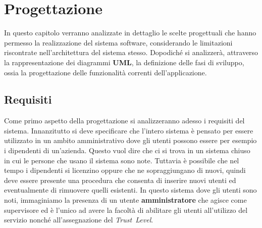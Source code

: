 \def \ti{\textit}
\def \bf{\textbf}

\chapter{Progettazione}
	\label{cap:progettazione}
	
    In questo capitolo verranno analizzate in dettaglio le scelte progettuali che hanno permesso la realizzazione del sistema software, considerando le limitazioni riscontrate nell'architettura del sistema stesso. Dopodiché si analizzerà, attraverso la rappresentazione dei diagrammi \textbf{UML}, la definizione delle fasi di sviluppo, ossia la progettazione delle funzionalità correnti dell'applicazione.

\section{Requisiti}
	\label{sec:requisiti}
	Come primo aspetto della progettazione si analizzeranno adesso i requisiti del sistema. Innanzitutto si deve specificare che l'intero sistema è pensato per essere utilizzato in un ambito amministrativo dove gli utenti possono essere per esempio i dipendenti di un'azienda. Questo vuol dire che ci si trova in un sistema chiuso in cui le persone che usano il sistema sono note. Tuttavia è possibile che nel tempo i dipendenti si licenzino oppure che ne sopraggiungano di nuovi, quindi deve essere presente una procedura che consenta di inserire nuovi utenti ed eventualmente di rimuovere quelli esistenti. In questo sistema dove gli utenti sono noti, immaginiamo la presenza di un utente \textbf{amministratore} che agisce come supervisore ed è l'unico ad avere la facoltà di abilitare gli utenti all'utilizzo del servizio nonché all'assegnazione del \emph{Trust~Level}.

